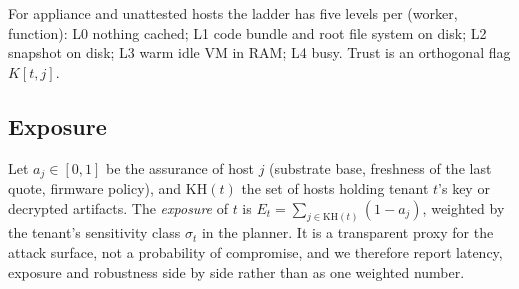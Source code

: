 For appliance and unattested hosts the ladder has five levels per (worker, function): L0 nothing cached; L1 code bundle and
root file system on disk; L2 snapshot on disk; L3 warm idle VM in RAM; L4 busy. Trust is an orthogonal flag $K[t,j]$.

\subsection{Exposure}
Let $a_j\in[0,1]$ be the assurance of host $j$ (substrate base, freshness of the last quote, firmware policy), and
$\mathrm{KH}(t)$ the set of hosts holding tenant $t$'s key or decrypted artifacts. The \emph{exposure} of $t$ is
$E_t=\sum_{j\in \mathrm{KH}(t)}(1-a_j)$, weighted by the tenant's sensitivity class $\sigma_t$ in the planner. It is a
transparent proxy for the attack surface, not a probability of compromise, and we therefore report latency, exposure and
robustness side by side rather than as one weighted number.
